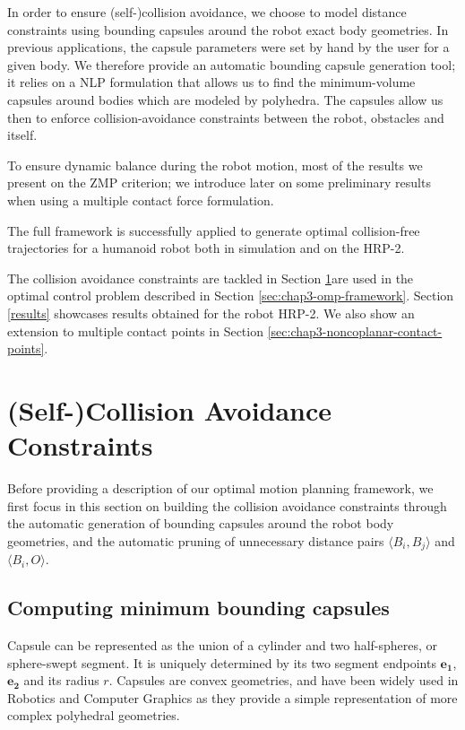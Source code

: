 In order to ensure (self-)collision avoidance, we choose to model
distance constraints using bounding capsules around the robot exact
body geometries. In previous applications, the capsule parameters were
set by hand by the user for a given body. We therefore provide an
automatic bounding capsule generation tool; it relies on a NLP
formulation that allows us to find the minimum-volume capsules around
bodies which are modeled by polyhedra. The capsules allow us then to
enforce collision-avoidance constraints between the robot, obstacles
and itself.

To ensure dynamic balance during the robot motion, most of the results
we present on the ZMP criterion; we introduce later on some
preliminary results when using a multiple contact force formulation.

The full framework is successfully applied to generate optimal
collision-free trajectories for a humanoid robot both in simulation
and on the HRP-2.

The collision avoidance constraints are tackled in Section
\ref{distance-constraints}are used in the optimal control problem
described in Section \ref{sec:chap3-omp-framework}. Section
\ref{results} showcases results obtained for the robot HRP-2. We also
show an extension to multiple contact points in Section
\ref{sec:chap3-noncoplanar-contact-points}.

\section{(Self-)Collision Avoidance Constraints}
\label{distance-constraints}

Before providing a description of our optimal motion planning
framework, we first focus in this section on building the collision
avoidance constraints through the automatic generation of bounding
capsules around the robot body geometries, and the automatic pruning
of unnecessary distance pairs $\langle B_i,B_j\rangle$ and $\langle
B_i,O\rangle$.

\subsection{Computing minimum bounding capsules}

Capsule can be represented as the union of a cylinder and two
half-spheres, or sphere-swept segment. It is uniquely determined by
its two segment endpoints $\mathbf{e_1}$, $\mathbf{e_2}$ and its
radius $r$. Capsules are convex geometries, and have been widely used
in Robotics and Computer Graphics as they provide a simple
representation of more complex polyhedral geometries.

